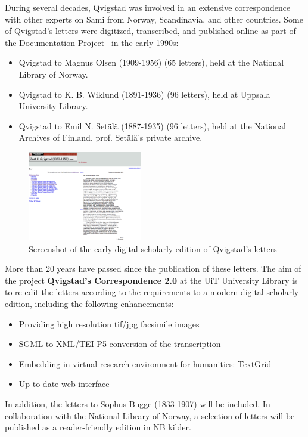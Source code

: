 \documentclass[runningheads]{llncs}
\begin{document}
During several decades, Qvigstad was involved in an extensive
correspondence with other experts on Sami from Norway, Scandinavia, and
other countries. Some of Qvigstad's letters were digitized, transcribed,
and published online as part of the Documentation
Project~\cite{ref_dokpro} in the early 1990s:
\begin{itemize}
\tightlist
\item
  Qvigstad to Magnus Olsen (1909-1956) (65 letters), held at the
  National Library of Norway.
\item
  Qvigstad to K. B. Wiklund (1891-1936) (96 letters), held at Uppsala
  University Library.
\item
  Qvigstad to Emil N. Setälä (1887-1935) (96 letters), held at the
  National Archives of Finland, prof. Setälä's private archive.
\end{itemize}

\begin{figure}[h!]
\centering
\includegraphics[width=50mm]{qvigstad_dokprosjekt_snapshot.png}
\caption{Screenshot of the early digital scholarly edition of Qvigstad's letters} \label{fig8}
\end{figure}
More than 20 years have passed since the publication of these letters.
The aim of the project \textbf{Qvigstad's Correspondence 2.0} at the UiT
University Library is to re-edit the letters according to the
requirements to a modern digital scholarly edition, including the
following enhancements:

\begin{itemize}
\tightlist
\item
  Providing high resolution tif/jpg facsimile images
\item
  SGML to XML/TEI P5 conversion of the transcription
\item
  Embedding in virtual research environment for humanities: TextGrid
\item
  Up-to-date web interface
\end{itemize}

In addition, the letters to Sophus Bugge (1833-1907) will be included.
In collaboration with the National Library of Norway, a selection of
letters will be published as a reader-friendly edition in NB kilder.
\end{document}
